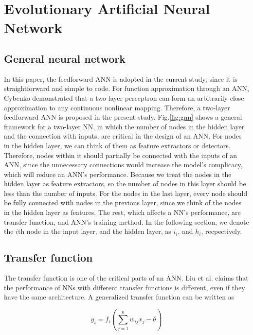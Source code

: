 \section{Evolutionary Artificial Neural Network}
\subsection{General neural network}
In this paper, the feedforward ANN is adopted in the current
study, since it is straightforward and simple to code. For function
approximation through an ANN, Cybenko demonstrated that a two-layer perceptron
can form an arbitrarily close approximation to any continuous nonlinear
mapping\cite{cybenko1989approximation}. Therefore, a two-layer feedforward ANN
is proposed in the present study. Fig.\ref{fig:gnn} shows a general framework for a
two-layer NN, in which the number of nodes in the hidden layer and the
connection with inputs, are critical in the design of an ANN. For nodes in the
hidden layer, we can think of them as feature extractors or detectors.
Therefore, nodes within it should partially be connected with the inputs of an ANN,
since the unnecessary connections would increase the model's complicacy, which
will reduce an ANN’s performance. Because we treat the nodes in the hidden layer
as feature extractors, so the number of nodes in this layer should be less than
the number of inputs. For the nodes in the last layer, every node should be
fully connected with nodes in the previous layer, since we think of the nodes
in the hidden layer as features. The rest, which affects a NN’s performance,
are transfer function, and ANN's training method. In the following section, we
denote the $i$th node in the input layer, and the hidden layer, as $i_i$, and $h_i$,
recpectively.



\subsection{Transfer function}

The transfer function is one of the critical parts of an ANN. Liu
\cite{liu1996evolutionary} et al. claims that the performance of NNs with
different transfer functions is different, even if they have the same
architecture.  A generalized transfer function can be written as

\begin{equation}
	y_i = f_i(\sum_{j=1}^n{w_{ij}x_j - \theta})
\end{equation}


